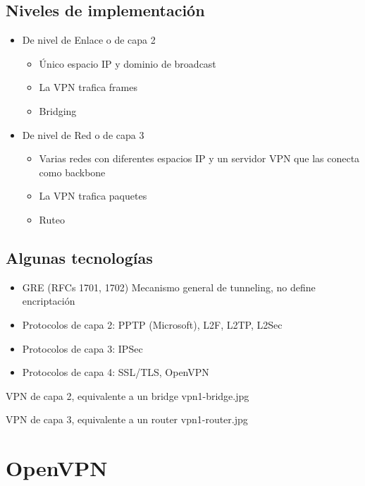 \subsection{Niveles de implementación}
\begin{itemize}	 

	\item De nivel de Enlace o de capa 2

	\begin{itemize}
		\item Único espacio IP y dominio de broadcast
		\item La VPN trafica frames
		\item Bridging
	\end{itemize} 

	\item De nivel de Red o de capa 3

	\begin{itemize}
		\item  Varias redes con diferentes espacios IP y un servidor VPN que las conecta como backbone 
		\item La VPN trafica paquetes
		\item Ruteo
	\end{itemize}
\end{itemize}


\subsection{Algunas tecnologías}
\begin{itemize}
	\item GRE (RFCs 1701, 1702) Mecanismo general de tunneling, no define encriptación
	\item Protocolos de capa 2: PPTP (Microsoft), L2F, L2TP, L2Sec
	\item Protocolos de capa 3: IPSec
	\item Protocolos de capa 4: SSL/TLS, OpenVPN
\end{itemize}


 {VPN de capa 2, equivalente a un bridge} {vpn1-bridge.jpg}

 {VPN de capa 3, equivalente a un router} {vpn1-router.jpg}


\section{OpenVPN}

